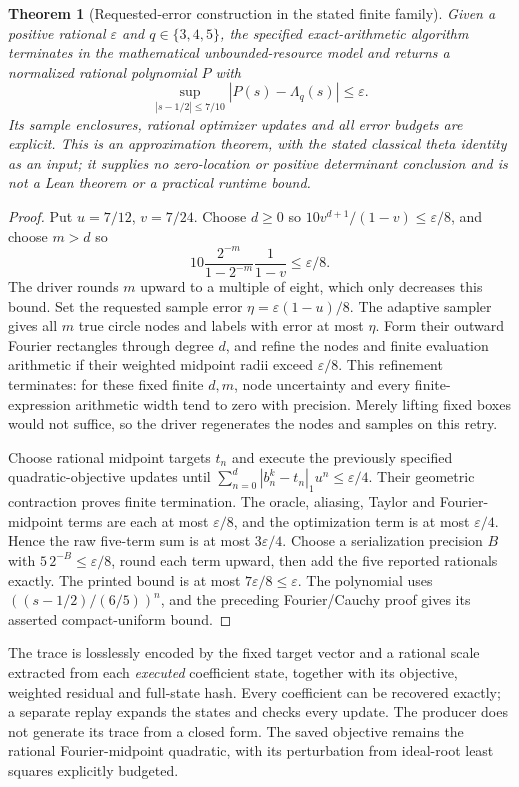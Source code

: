 \documentclass[11pt,oneside,openany]{book}
\newtheorem{theorem}{Theorem}[chapter]
\theoremstyle{definition}\newtheorem{definition}[theorem]{Definition}
\theoremstyle{remark}\newtheorem{remark}[theorem]{Remark}
\begin{document}
\begin{theorem}[Requested-error construction in the stated finite family]\label{at:requested}
Given a positive rational $\varepsilon$ and $q\in\{3,4,5\}$, the specified
exact-arithmetic algorithm terminates in the mathematical unbounded-resource
model and returns a normalized rational polynomial $P$ with
\[
 \sup_{|s-1/2|\le7/10}|P(s)-\Lambda_q(s)|\le\varepsilon.
\]
Its sample enclosures, rational optimizer updates and all error budgets are
explicit. This is an approximation theorem, with the stated classical theta
identity as an input; it supplies no zero-location or positive determinant
conclusion and is not a Lean theorem or a practical runtime bound.
\end{theorem}
\begin{proof}
Put $u=7/12$, $v=7/24$. Choose $d\ge0$ so
$10v^{d+1}/(1-v)\le\varepsilon/8$, and choose $m>d$ so
\[
 10\frac{2^{-m}}{1-2^{-m}}\frac1{1-v}\le\varepsilon/8.
\]
The driver rounds $m$ upward to a multiple of eight, which only decreases
this bound. Set the requested sample error
$\eta=\varepsilon(1-u)/8$. The adaptive sampler gives all $m$ true circle
nodes and labels with error at most $\eta$. Form their outward Fourier
rectangles through degree $d$, and refine the nodes and finite evaluation
arithmetic if their weighted midpoint radii exceed $\varepsilon/8$.
This refinement terminates: for these fixed finite $d,m$, node uncertainty
and every finite-expression arithmetic width tend to zero with precision.
Merely lifting fixed boxes would not suffice, so the driver regenerates the
nodes and samples on this retry.

Choose rational midpoint targets $t_n$ and execute the previously specified
quadratic-objective updates until
$\sum_{n=0}^d|b_n^k-t_n|_1u^n\le\varepsilon/4$.
Their geometric contraction proves finite termination. The oracle,
aliasing, Taylor and Fourier-midpoint terms are each at most
$\varepsilon/8$, and the optimization term is at most $\varepsilon/4$.
Hence the raw five-term sum is at most $3\varepsilon/4$.
Choose a serialization precision $B$ with $5\,2^{-B}\le\varepsilon/8$,
round each term upward, then add the five reported rationals exactly.
The printed bound is at most $7\varepsilon/8\le\varepsilon$.
The polynomial uses $((s-1/2)/(6/5))^n$, and the preceding Fourier/Cauchy
proof gives its asserted compact-uniform bound.
\end{proof}

The trace is losslessly encoded by the fixed target vector and a rational
scale extracted from each \emph{executed} coefficient state, together with
its objective, weighted residual and full-state hash. Every coefficient
can be recovered exactly; a separate replay expands the states and checks
every update. The producer does not generate its trace from a closed form.
The saved objective remains the rational Fourier-midpoint quadratic, with
its perturbation from ideal-root least squares explicitly budgeted.
\end{document}
